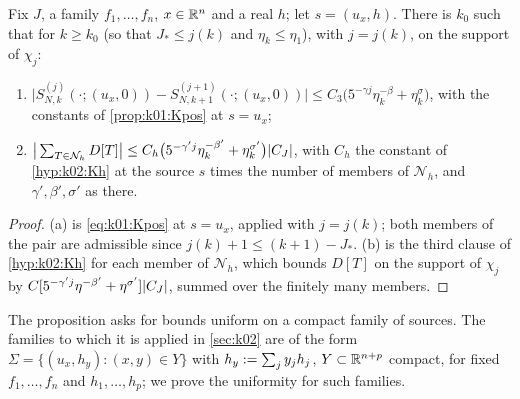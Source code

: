 \begin{lemma}\label{app:a04:lem:rows}
Fix $J$, a family $f_1,\dots,f_n$, $x\in\mathbb R^n$ and a real $h$; let $s=(u_x,h)$. There is $k_0$ such that for $k\ge k_0$ (so that $J_*\le j(k)$ and $\eta_k\le\eta_1$), with $j=j(k)$, on the support of $\chi_j$:
\begin{enumerate}[label=\textup{(\alph*)},leftmargin=*]
\item $\big|S^{(j)}_{N,k}(\cdot;(u_x,0))-S^{(j+1)}_{N,k+1}(\cdot;(u_x,0))\big|\le C_3\big(5^{-\gamma j}\eta_k^{-\beta}+\eta_k^{\sigma}\big)$, with the constants of \cref{prop:k01:Kpos} at $s=u_x$;
\item $\big|\sum_{T\in\mathcal N_h}D[T]\big|\le C_h\big(5^{-\gamma'j}\eta_k^{-\beta'}+\eta_k^{\sigma'}\big)|C_J|$, with $C_h$ the constant of \cref{hyp:k02:Kh} at the source $s$ times the number of members of $\mathcal N_h$, and $\gamma',\beta',\sigma'$ as there.
\end{enumerate}
\end{lemma}
\begin{proof}
(a) is \eqref{eq:k01:Kpos} at $s=u_x$, applied with $j=j(k)$; both members of the pair are admissible since $j(k)+1\le(k+1)-J_*$. (b) is the third clause of \cref{hyp:k02:Kh} for each member of $\mathcal N_h$, which bounds $D[T]$ on the support of $\chi_j$ by $C[5^{-\gamma'j}\eta^{-\beta'}+\eta^{\sigma'}]|C_J|$, summed over the finitely many members.
\end{proof}

The proposition asks for bounds uniform on a compact family of sources. The families to which it is applied in \cref{sec:k02} are of the form $\Sigma=\{(u_x,h_y):(x,y)\in Y\}$ with $h_y:=\sum_jy_jh_j$, $Y\subset\mathbb R^{n+p}$ compact, for fixed $f_1,\dots,f_n$ and $h_1,\dots,h_p$; we prove the uniformity for such families.

